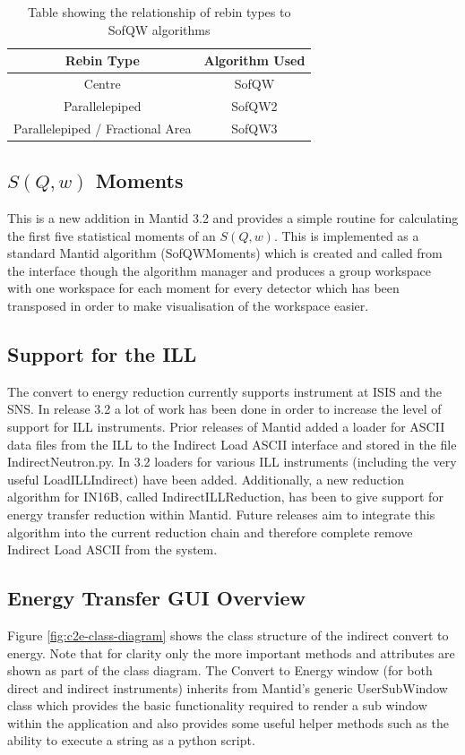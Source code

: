 \documentclass[paper=a4, fontsize=11pt]{scrartcl}	%
\numberwithin{equation}{section}															%
\numberwithin{figure}{section}																%
\numberwithin{table}{section}																%
\begin{document}
\begin{table}[H]
\begin{center}
\begin{tabular}{ c c}
Rebin Type & Algorithm Used \\ \hline
Centre & SofQW \\
Parallelepiped & SofQW2 \\
Parallelepiped / Fractional Area & SofQW3 \\
\end{tabular}
\caption{Table showing the relationship of rebin types to SofQW algorithms}
\label{table:sofqw-algorithms}
\end{center}
\end{table}

\subsection{$S(Q,w)$ Moments}
This is a new addition in Mantid 3.2 and provides a simple routine for calculating the first five statistical moments of an $S(Q,w)$. This is implemented as a standard Mantid algorithm (SofQWMoments) which is created and called from the interface though the algorithm manager and produces a group workspace with one workspace for each moment for every detector which has been transposed in order to make visualisation of the workspace easier.

\subsection{Support for the ILL}
The convert to energy reduction currently supports instrument at ISIS and the SNS. In release 3.2 a lot of work has been done in order to increase the level of support for ILL instruments. Prior releases of Mantid added a loader for ASCII data files from the ILL to the Indirect Load ASCII interface and stored in the file IndirectNeutron.py. In 3.2 loaders for various ILL instruments (including the very useful LoadILLIndirect) have been added. Additionally, a new reduction algorithm for IN16B, called IndirectILLReduction, has been to give support for energy transfer reduction within Mantid. Future releases aim to integrate this algorithm into the current reduction chain and therefore complete remove Indirect Load ASCII from the system.

\subsection{Energy Transfer GUI Overview}
\label{subsec:c2e-gui-overview}
Figure \ref{fig:c2e-class-diagram} shows the class structure of the indirect convert to energy. Note that for clarity only the more important methods and attributes are shown as part of the class diagram. The Convert to Energy window (for both direct and indirect instruments) inherits from Mantid's generic UserSubWindow class which provides the basic functionality required to render a sub window within the application and also provides some useful helper methods such as the ability to execute a string as a python script.
\end{document}
